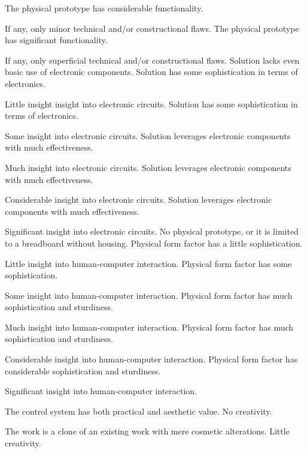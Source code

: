 \documentclass{../../fal_assignment}
\begin{document}
\begin{markingrubric}
	\grade The physical prototype has considerable functionality.
	\par If any, only minor technical and/or constructional flaws.
	\grade The physical prototype has significant functionality.
	\par If any, only superficial technical and/or constructional flaws.
	\grade\fail Solution lacks even basic use of electronic components.
	\grade Solution has some sophistication in terms of electronics.
	\par Little insight insight into electronic circuits.
	\grade Solution has some sophistication  in terms of electronics.
	\par Some insight into electronic circuits.
	\grade Solution leverages electronic components with much effectiveness.
	\par Much insight into electronic circuits.
	\grade Solution leverages electronic components with much effectiveness.
	\par Considerable insight into electronic circuits.
	\grade Solution leverages electronic components with much effectiveness.
	\par Significant insight into electronic circuits.
	\grade\fail No physical prototype, or it is limited to a breadboard without housing.
	\grade Physical form factor has a little sophistication.
	\par Little insight into human-computer interaction.
	\grade Physical form factor has some sophistication.
	\par Some insight into human-computer interaction.
	\grade Physical form factor has much sophistication and sturdiness.
	\par Much insight into human-computer interaction.
	\grade Physical form factor has much sophistication  and sturdiness.
	\par Considerable insight into human-computer interaction.
	\grade Physical form factor has considerable sophistication and sturdiness.
	\par Significant insight into human-computer interaction.
	\par The control system has both practical and aesthetic value.
	\grade\fail No creativity.
	\par The work is a clone of an existing work with mere cosmetic alterations.
	\grade Little creativity.

\end{markingrubric}
\end{document}
